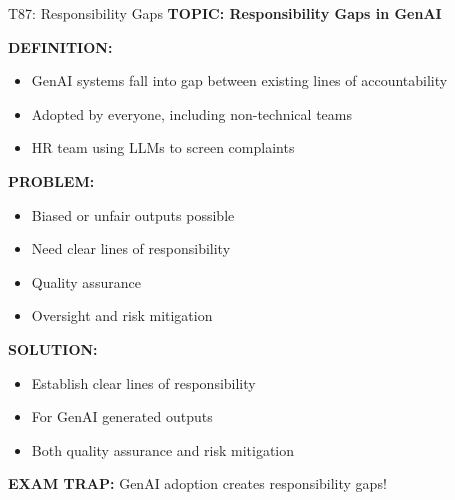 \documentclass[8pt]{beamer}
\begin{document}
	\begin{frame}{T87: Responsibility Gaps}
		\fontsize{6.5}{7.5}\selectfont
		\textbf{TOPIC: Responsibility Gaps in GenAI}
		
		\vspace{0.1cm}
		\textbf{DEFINITION:}
		\begin{itemize}
			\item GenAI systems fall into gap between existing lines of accountability
			\item Adopted by everyone, including non-technical teams
			\item HR team using LLMs to screen complaints
		\end{itemize}
		
		\vspace{0.1cm}
		\textbf{PROBLEM:}
		\begin{itemize}
			\item Biased or unfair outputs possible
			\item Need clear lines of responsibility
			\item Quality assurance
			\item Oversight and risk mitigation
		\end{itemize}
		
		\vspace{0.1cm}
		\textbf{SOLUTION:}
		\begin{itemize}
			\item Establish clear lines of responsibility
			\item For GenAI generated outputs
			\item Both quality assurance and risk mitigation
		\end{itemize}
		
		\textcolor{myred}{\textbf{EXAM TRAP:}} GenAI adoption creates \textcolor{myblue}{responsibility gaps}!
	\end{frame}
	
\end{document}
